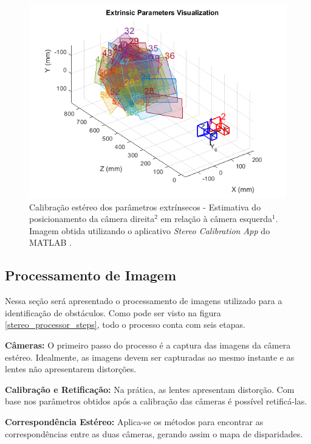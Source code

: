 \begin{figure}[H]
 	\centering
 	\includegraphics[scale=0.70]{./Resources/stereo_calib_extrinsic.png}
 	\caption{Calibração estéreo dos parâmetros extrínsecos - Estimativa do posicionamento da câmera direita$^2$ em relação à câmera esquerda$^1$. Imagem obtida utilizando o aplicativo \textit{Stereo Calibration App} do MATLAB \cite{MatlabStereoApp}.}
 	\label{stereo_calib_extrinsic}
\end{figure}

\subsection{Processamento de Imagem}

Nessa seção será apresentado o processamento de imagens utilizado para a identificação de obstáculos. Como pode ser visto na figura \ref{stereo_processor_steps}, todo o processo conta com seis etapas.

\textbf{Câmeras:} O primeiro passo do processo é a captura das imagens da câmera estéreo. Idealmente, as imagens devem ser capturadas ao mesmo instante e as lentes não apresentarem distorções.   

\textbf{Calibração e Retificação:} Na prática, as lentes apresentam distorção. Com base nos parâmetros obtidos após a calibração das câmeras é possível retificá-las. 

\textbf{Correspondência Estéreo:} Aplica-se os métodos para encontrar as correspondências entre as duas câmeras, gerando assim o mapa de disparidades.


